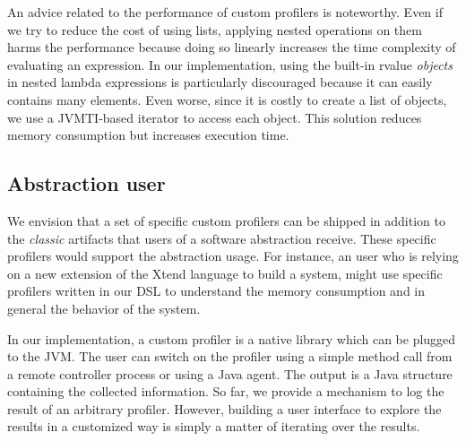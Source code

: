 An advice related to the performance of custom profilers is noteworthy.
Even if we try to reduce the cost of using lists, applying nested operations on them harms the performance because doing so linearly increases the time complexity of evaluating an expression.
In our implementation, using the built-in rvalue \textit{objects} in nested lambda expressions is particularly discouraged because it can easily contains many elements.
Even worse, since it is costly to create a list of objects, we use a JVMTI-based iterator to access each object.
This solution reduces memory consumption but increases execution time.

\subsection{Abstraction user}

We envision that a set of specific custom profilers can be shipped in addition to the \textit{classic} artifacts that users of a software abstraction receive. 
These specific profilers would support the abstraction usage.
For instance, an user who is relying on a new extension of the Xtend language to build a system, might use specific profilers written in our DSL to understand the memory consumption and in general the behavior of the system.

In our implementation, a custom profiler is a native library which can be plugged to the JVM.
The user can switch on the profiler using a simple method call from a remote controller process or using a Java agent.
The output is a Java structure containing the collected information.
So far, we provide a mechanism to log the result of an arbitrary profiler.
However, building a user interface to explore the results in a customized way is simply a matter of iterating over the results.  






